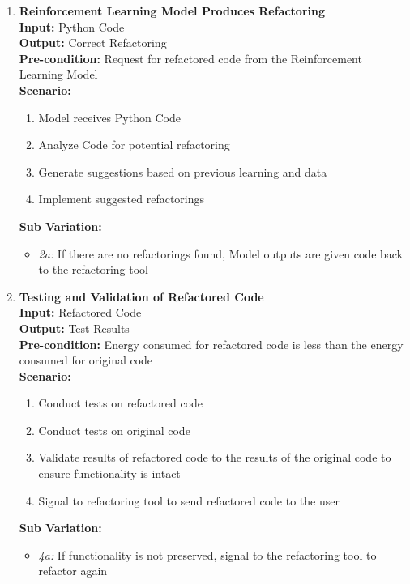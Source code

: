 \documentclass[12pt]{article}
\begin{document}
\begin{enumerate}[label={\bf BUC \arabic*:}, wide=0pt, font=\itshape]
  \item {\bf Reinforcement Learning Model Produces Refactoring} \\[2mm]
    \textbf{Input:} Python Code \\
    \textbf{Output:} Correct Refactoring \\
    \textbf{Pre-condition:} Request for refactored code from the
    Reinforcement Learning Model \\[2mm]
    \textbf{Scenario: }
    \begin{enumerate}[label=\arabic*.]
      \item Model receives Python Code
      \item Analyze Code for potential refactoring
      \item Generate suggestions based on previous learning and data
      \item Implement suggested refactorings
    \end{enumerate}
    \textbf{Sub Variation: }
    \begin{itemize}
      \item \textit{2a:} If there are no refactorings found, Model
        outputs are given code back to the refactoring tool
    \end{itemize}

  \item {\bf Testing and Validation of Refactored Code} \\[2mm]
    \textbf{Input:} Refactored Code \\
    \textbf{Output:} Test Results \\
    \textbf{Pre-condition:} Energy consumed for refactored code is
    less than the energy consumed for original code \\[2mm]
    \textbf{Scenario: }
    \begin{enumerate}[label=\arabic*.]
      \item Conduct tests on refactored code
      \item Conduct tests on original code
      \item Validate results of refactored code to the results of the
        original code to ensure functionality is intact
      \item Signal to refactoring tool to send refactored code to the user
    \end{enumerate}
    \textbf{Sub Variation: }
    \begin{itemize}
      \item \textit{4a:} If functionality is not preserved, signal to
        the refactoring tool to refactor again
    \end{itemize}


\end{enumerate}
\end{document}
